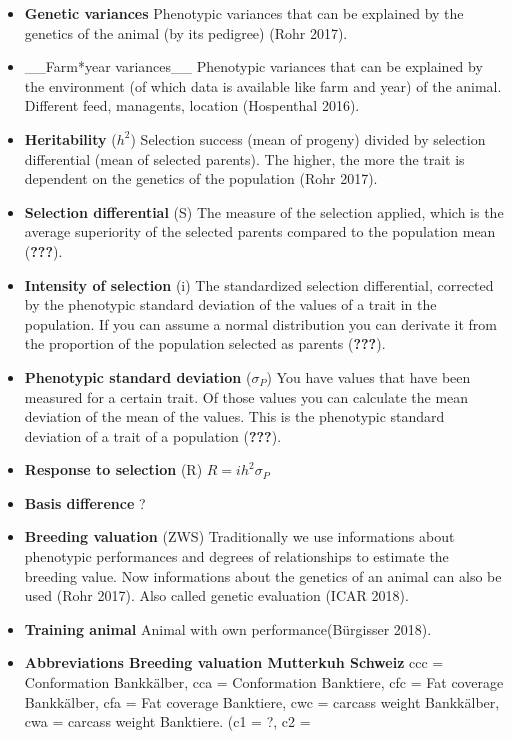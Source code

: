 \documentclass[]{article}
\begin{document}
\begin{itemize}
\item
  \textbf{Genetic variances} Phenotypic variances that can be explained
  by the genetics of the animal (by its pedigree) (Rohr 2017).
\item
  \_\_Farm*year variances\_\_ Phenotypic variances that can be explained
  by the environment (of which data is available like farm and year) of
  the animal. Different feed, managents, location (Hospenthal 2016).
\item
  \textbf{Heritability} (\(h^2\)) Selection success (mean of progeny)
  divided by selection differential (mean of selected parents). The
  higher, the more the trait is dependent on the genetics of the
  population (Rohr 2017).
\item
  \textbf{Selection differential} (S) The measure of the selection
  applied, which is the average superiority of the selected parents
  compared to the population mean ({\textbf{???}}).
\item
  \textbf{Intensity of selection} (i) The standardized selection
  differential, corrected by the phenotypic standard deviation of the
  values of a trait in the population. If you can assume a normal
  distribution you can derivate it from the proportion of the population
  selected as parents ({\textbf{???}}).
\item
  \textbf{Phenotypic standard deviation} (\(\sigma_{P}\)) You have
  values that have been measured for a certain trait. Of those values
  you can calculate the mean deviation of the mean of the values. This
  is the phenotypic standard deviation of a trait of a population
  ({\textbf{???}}).
\item
  \textbf{Response to selection} (R) \(R=ih^2\sigma_{P}\)
\item
  \textbf{Basis difference} ?
\item
  \textbf{Breeding valuation} (ZWS) Traditionally we use informations
  about phenotypic performances and degrees of relationships to estimate
  the breeding value. Now informations about the genetics of an animal
  can also be used (Rohr 2017). Also called genetic evaluation (ICAR
  2018).
\item
  \textbf{Training animal} Animal with own performance(Bürgisser 2018).
\item
  \textbf{Abbreviations Breeding valuation Mutterkuh Schweiz} ccc =
  Conformation Bankkälber, cca = Conformation Banktiere, cfc = Fat
  coverage Bankkälber, cfa = Fat coverage Banktiere, cwc = carcass
  weight Bankkälber, cwa = carcass weight Banktiere. (c1 = ?, c2 =

\end{itemize}
\end{document}
